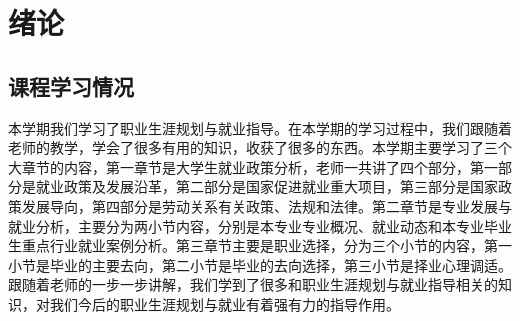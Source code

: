 \documentclass{ctexart}
\begin{document}
	\section{绪论}
		\subsection{课程学习情况}
			本学期我们学习了职业生涯规划与就业指导\uppercase\expandafter{}。在本学期的学习过程中，我们跟随着老师的教学，学会了很多有用的知识，收获了很多的东西。本学期主要学习了三个大章节的内容，第一章节是大学生就业政策分析，老师一共讲了四个部分，第一部分是就业政策及发展沿革，第二部分是国家促进就业重大项目，第三部分是国家政策发展导向，第四部分是劳动关系有关政策、法规和法律。第二章节是专业发展与就业分析，主要分为两小节内容，分别是本专业专业概况、就业动态和本专业毕业生重点行业就业案例分析。第三章节主要是职业选择，分为三个小节的内容，第一小节是毕业的主要去向，第二小节是毕业的去向选择，第三小节是择业心理调适。跟随着老师的一步一步讲解，我们学到了很多和职业生涯规划与就业指导相关的知识，对我们今后的职业生涯规划与就业有着强有力的指导作用。
\end{document}
